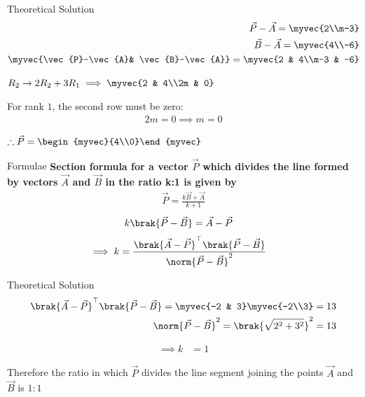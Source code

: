 \documentclass{beamer}
\begin{document}
\begin{frame}{Theoretical Solution}
\begin{align}
            \vec{P}-\vec{A} = \myvec{2\\m-3}\\
            \vec{B}-\vec{A} = \myvec{4\\-6}\\
            \myvec{\vec{P}-\vec{A}& \vec{B}-\vec{A}} = \myvec{2 & 4\\m-3 & -6}
\end{align}
\begin{center}
$R_2 \rightarrow 2R_2 + 3R_1 \implies \myvec{2 & 4\\2m & 0}$
\end{center}
For rank $1$, the second row must be zero:
\begin{align}
    2m=0 \implies m=0
\end{align}
\begin{center}
$\therefore \vec{P}=\begin{myvec}{4\\0}\end{myvec}$
\end{center}
\end{frame}

\begin{frame}{Formulae}
\textbf{Section formula for a vector $\vec{P}$ which divides the line formed by vectors $\vec{A}$ and $\vec{B}$ in the ratio k:1 is given by}
\begin{align}
    \vec{P}=\frac{k\vec{B}+\vec{A}}{k+1}
\end{align}
\begin{align}
			k\brak{\vec{P}-\vec{B}}&= \vec{A}-\vec{P}
\end{align}
\begin{align}
			\implies k &=
			\frac{\brak{\vec{A}-\vec{P}}^{\top}\brak{\vec{P}-\vec{B}}}{\norm{\vec{P}-\vec{B}}^2}
			\label{eq:section_formula-k}
\end{align}
\end{frame}
\begin{frame}{Theoretical Solution}
\begin{align}
\brak{\vec{A}-\vec{P}}^{\top}\brak{\vec{P}-\vec{B}} = \myvec{-2 & 3}\myvec{-2\\3} = 13\\
{\norm{\vec{P}-\vec{B}}^2} = \brak{\sqrt{2^2 + 3^2}}^2 = 13
\end{align}

\begin{align}
\implies k &= 1
\end{align}

Therefore the ratio in which $\vec{P}$ divides the line segment joining the points $\vec{A}$ and $\vec{B}$ is $1:1$\\
\end{frame}
\end{document}
